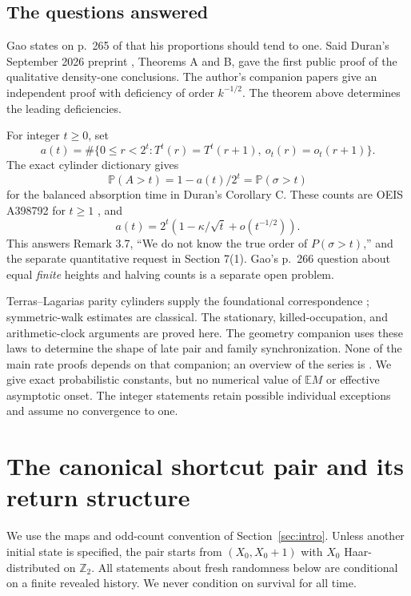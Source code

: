 \documentclass[11pt]{amsart}
\theoremstyle{definition}
\theoremstyle{remark}
\newcommand{\E}{\mathbb E}
\newcommand{\PP}{\mathbb P}
\newcommand{\Ztwo}{\mathbb Z_2}
\begin{document}
\subsection*{The questions answered}
Gao states on p.~265 of \cite{Gao1993} that his proportions should tend
to one. Said Duran's September 2026 preprint \cite{Duran2026},
Theorems A and B, gave the first public proof of the qualitative
density-one conclusions. The author's companion papers
\cite{GaoDensityOne,GaoTao} give an independent proof with deficiency
of order $k^{-1/2}$. The theorem above determines the leading
deficiencies.

For integer $t\ge0$, set
\[
a(t)=\#\{0\le r<2^t:T^t(r)=T^t(r+1),\ o_t(r)=o_t(r+1)\}.
\]
The exact cylinder dictionary gives
\begin{equation}\label{eq:duran-law}
\PP(A>t)=1-a(t)/2^t=\PP(\sigma>t)
\end{equation}
for the balanced absorption time in Duran's Corollary C. These counts
are OEIS A398792 for $t\ge1$ \cite{OEIS398792}, and
\begin{equation}\label{eq:sequence-asymptotic}
a(t)=2^t(1-\kappa/\sqrt t+o(t^{-1/2})).
\end{equation}
This answers Remark 3.7, ``We do not know the true order of
$P(\sigma>t)$,'' and the separate quantitative request in Section 7(1).
Gao's p.~266 question about equal \emph{finite} heights and halving
counts is a separate open problem.

Terras--Lagarias parity cylinders supply the foundational correspondence
\cite{Terras1976,Lagarias1985}; symmetric-walk estimates are classical.
The stationary, killed-occupation, and arithmetic-clock arguments are
proved here. The geometry companion \cite{GeometryCompanion} uses these
laws to determine the shape of late pair and family synchronization.
None of the main rate proofs depends on that companion; an overview of
the series is \cite{Umbrella}. We give exact
probabilistic constants, but no numerical value of $\E M$ or effective
asymptotic onset. The integer statements retain possible individual
exceptions and assume no convergence to one.

\section{The canonical shortcut pair and its return structure}\label{sec:pair}

We use the maps and odd-count convention of Section~\ref{sec:intro}.
Unless another initial state is specified, the pair starts from
$(X_0,X_0+1)$ with $X_0$ Haar-distributed on $\Ztwo$.
All statements about fresh randomness
below are conditional on a finite revealed history.  We never condition on
survival for all time.
\end{document}
